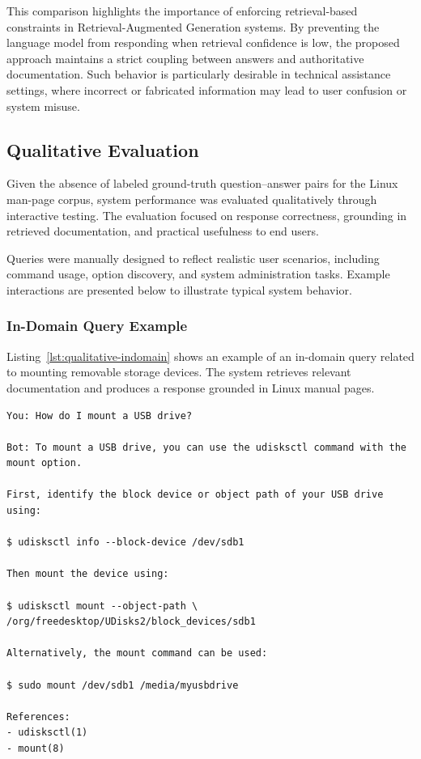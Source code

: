 \documentclass[conference]{IEEEtran}
\begin{document}
This comparison highlights the importance of enforcing retrieval-based constraints in Retrieval-Augmented Generation systems. By preventing the language model from responding when retrieval confidence is low, the proposed approach maintains a strict coupling between answers and authoritative documentation. Such behavior is particularly desirable in technical assistance settings, where incorrect or fabricated information may lead to user confusion or system misuse.


\subsection{Qualitative Evaluation}

Given the absence of labeled ground-truth question--answer pairs for the Linux man-page corpus, system performance was evaluated qualitatively through interactive testing. The evaluation focused on response correctness, grounding in retrieved documentation, and practical usefulness to end users.

Queries were manually designed to reflect realistic user scenarios, including command usage, option discovery, and system administration tasks. Example interactions are presented below to illustrate typical system behavior.

\subsubsection{In-Domain Query Example}

Listing~\ref{lst:qualitative-indomain} shows an example of an in-domain query related to mounting removable storage devices. The system retrieves relevant documentation and produces a response grounded in Linux manual pages.

\begin{lstlisting}[caption={Qualitative evaluation: in-domain query}, label={lst:qualitative-indomain}]
You: How do I mount a USB drive?

Bot: To mount a USB drive, you can use the udisksctl command with the
mount option.

First, identify the block device or object path of your USB drive using:

$ udisksctl info --block-device /dev/sdb1

Then mount the device using:

$ udisksctl mount --object-path \
/org/freedesktop/UDisks2/block_devices/sdb1

Alternatively, the mount command can be used:

$ sudo mount /dev/sdb1 /media/myusbdrive

References:
- udisksctl(1)
- mount(8)
\end{lstlisting}
\end{document}
